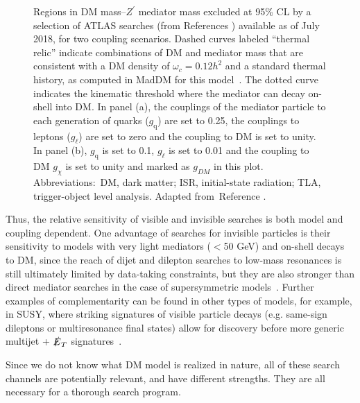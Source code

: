 \documentclass{ar-1col}
\newcommand{\chiDM}{\ensuremath{\chi}\xspace}
\newcommand{\IP}{invisible particle}
\newcommand{\gDM}{\ensuremath{g_{\chiDM}}\xspace}
\newcommand{\gdm}{\gDM}
\newcommand{\gl}{$g_{\ell}$\xspace}
\newcommand{\gq}{$g_{\mathrm{q}}$\xspace}
\newcommand{\MET}{\ensuremath{\slashed{E}_T}\xspace}
\newcommand{\Zprime}{\ensuremath{{Z}^\prime}\xspace}
\begin{document}
{%
\begin{figure}[!htpb]
\caption{Regions in DM mass--\Zprime mediator mass
excluded at 95\% CL by a selection of ATLAS searches 
(from References \cite{ATLAS:2016bvn,Aaboud:2018fzt,Aaboud:2017yvp,
Aaboud:2017phn,ATLAS-CONF-2018-005,Aaboud:2017bja,Aaboud:2017dor,
Aaboud:2017buh}) 
available as of July 2018, for two coupling scenarios. Dashed curves labeled ``thermal
relic'' indicate combinations of DM and mediator mass
that are consistent with a DM density of $\omega_c = 0.12
h^2$ and a standard thermal history, as computed in MadDM for this
model~\cite{Backovic:2015cra}. The dotted curve indicates the
kinematic threshold where the mediator can decay on-shell into
DM. 
In panel (a), the couplings of the mediator particle to each generation
of quarks (\gq) are set to 0.25, the couplings to leptons (\gl)
are set to zero and the coupling to DM is set to unity. 
In panel (b), \gq is set to 0.1, \gl is set to 0.01
and the coupling to DM \gdm is set to unity and marked as $g_{DM}$ in this plot.
Abbreviations:\ DM, dark matter; ISR, initial-state radiation; 
TLA, trigger-object level analysis. Adapted from~Reference .}
\label{fig:sensitivityComparison}
\end{figure}

Thus, the relative sensitivity of visible and invisible searches
is both model and coupling dependent. One advantage of
searches for {\IP}s is their sensitivity to models
with very light mediators ($<$50 GeV) and on-shell decays to DM, since the
reach of dijet and dilepton searches to low-mass resonances is
still ultimately limited by data-taking constraints, 
but they are also stronger than direct mediator searches in the
case of supersymmetric models~\cite{Liew:2016oon}. 
Further examples of complementarity can be found in other types of models, 
for example, in SUSY, where striking signatures of visible particle decays (e.g. same-sign dileptons
or multiresonance final states) allow for discovery before more generic multijet + \MET signatures~\cite{Acharya:2009gb}. 

Since we do not know what DM model is realized in nature, 
all of these search channels are potentially relevant, 
and have different strengths. They are all necessary for 
a thorough search program. 

}
\end{document}
